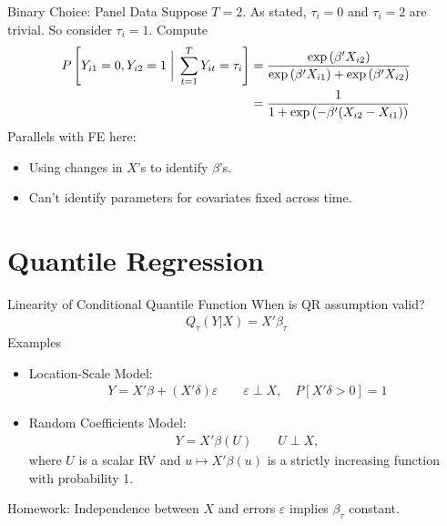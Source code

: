 \documentclass[handout]{beamer}
\newcommand{\sumtT}{\sum^T_{t=1}}
\begin{document}
\begin{frame}[shrink]{Binary Choice: Panel Data}
Suppose $T=2$.
As stated, $\tau_i=0$ and $\tau_i=2$ are trivial.
So consider $\tau_i=1$.
Compute
\begin{align*}
  P\left[
  Y_{i1}=0,Y_{i2}=1
  \;\bigg|\;
  \sumtT
  Y_{it}
  =
  \tau_i
  \right]
  &=
  \frac{%
    \exp\left(
    \beta' X_{i2}
    \right)
  }{%
    \exp\left(
    \beta'X_{i1}
    \right)
    +
    \exp\left(
    \beta'X_{i2}
    \right)
  }
  \\
  &=
  \frac{%
    1
  }{%
    1+
    \exp\left(
    -\beta'(X_{i2}-X_{i1})
    \right)
  }
\end{align*}
Parallels with FE here:
\begin{itemize}
  \item Using changes in $X$'s to identify $\beta$'s.
  \item Can't identify parameters for covariates fixed across time.
\end{itemize}
\end{frame}



\section{Quantile Regression}



\begin{frame}[shrink]{Linearity of Conditional Quantile Function}
When is QR assumption valid?
\begin{align*}
  Q_\tau(Y|X) = X'\beta_\tau
\end{align*}
Examples
\begin{itemize}
  \item \alert{Location-Scale Model}:
    \begin{align*}
      Y = X'\beta + (X'\delta)\varepsilon
      \qquad
      \varepsilon\perp X,
      \quad
      P[X'\delta>0]=1
    \end{align*}

  \item
    \alert{Random Coefficients Model}:
    \begin{align*}
      Y = X'\beta(U)
      \qquad
      U\perp X,
    \end{align*}
    where $U$ is a scalar RV and $u\mapsto X'\beta(u)$ is a strictly
    increasing function with probability 1.
\end{itemize}
Homework:
Independence between $X$ and errors $\varepsilon$ implies $\beta_\tau$
constant.
\end{frame}
\end{document}
